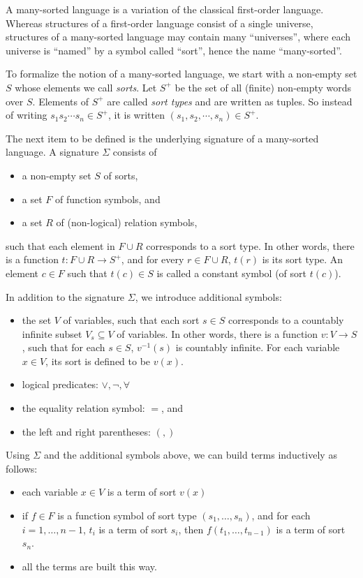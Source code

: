 \documentclass[12pt]{article}
\begin{document}

A many-sorted language is a variation of the classical first-order language.  Whereas structures of a first-order language consist of a single universe, structures of a many-sorted language may contain many ``universes'', where each universe is ``named'' by a symbol called ``sort'', hence the name ``many-sorted''.  

To formalize the notion of a many-sorted language, we start with a non-empty set $S$ whose elements we call \emph{sorts}.  Let $S^+$ be the set of all (finite) non-empty words over $S$.  Elements of $S^+$ are called \emph{sort types} and are written as tuples.  So instead of writing $s_1s_2\cdots s_n \in S^+$, it is written $(s_1, s_2, \cdots, s_n)\in S^+$.

The next item to be defined is the underlying signature of a many-sorted language.  A signature $\Sigma$ consists of 
\begin{itemize}
\item a non-empty set $S$ of sorts, 
\item a set $F$ of function symbols, and 
\item a set $R$ of (non-logical) relation symbols, 
\end{itemize}
such that each element in $F\cup R$ corresponds to a sort type.  In other words, there is a function $t:F\cup R\to S^+$, and for every $r\in F\cup R$, $t(r)$ is its sort type.  An element $c\in F$ such that $t(c)\in S$ is called a constant symbol (of sort $t(c)$).

In addition to the signature $\Sigma$, we introduce additional symbols: 
\begin{itemize}
\item the set $V$ of variables, such that each sort $s\in S$ corresponds to a countably infinite subset $V_s\subseteq V$ of variables.  In other words, there is a function $v:V\to S$, such that for each $s\in S$, $v^{-1}(s)$ is countably infinite.  For each variable $x\in V$, its sort is defined to be $v(x)$.
\item logical predicates: $\vee, \neg, \forall$
\item the equality relation symbol: $=$, and
\item the left and right parentheses: $(,)$
\end{itemize}

Using $\Sigma$ and the additional symbols above, we can build terms inductively as follows:
\begin{itemize}
\item each variable $x\in V$ is a term of sort $v(x)$
\item if $f\in F$ is a function symbol of sort type $(s_1,\ldots,s_n)$, and for each $i=1,\ldots,n-1$, $t_i$ is a term of sort $s_i$, then $f(t_1,\ldots,t_{n-1})$ is a term of sort $s_n$.
\item all the terms are built this way.
\end{itemize}
\end{document}
